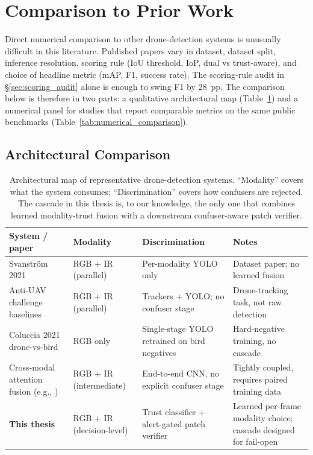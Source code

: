 \documentclass[12pt,a4paper,oneside,openright]{book}
\begin{document}
\section{Comparison to Prior Work}
\label{sec:comparison}

Direct numerical comparison to other drone-detection systems is unusually difficult in this literature. Published papers vary in dataset, dataset split, inference resolution, scoring rule (IoU threshold, IoP, dual vs trust-aware), and choice of headline metric (mAP, F1, success rate). The scoring-rule audit in \S\ref{sec:scoring_audit} alone is enough to swing F1 by 28~pp. The comparison below is therefore in two parts: a qualitative architectural map (Table~\ref{tab:related_systems}) and a numerical panel for studies that report comparable metrics on the same public benchmarks (Table~\ref{tab:numerical_comparison}).

\subsection{Architectural Comparison}

\begin{table}[htbp]
    \centering
    \caption{Architectural map of representative drone-detection systems. ``Modality'' covers what the system consumes; ``Discrimination'' covers how confusers are rejected. The cascade in this thesis is, to our knowledge, the only one that combines learned modality-trust fusion with a downstream confuser-aware patch verifier.}
    \label{tab:related_systems}
    \begin{tabular}{p{4.0cm}lll}
        \toprule
        System / paper & Modality & Discrimination & Notes \\
        \midrule
        Svanstr\"om 2021~\cite{svanstrom2021real} & RGB + IR (parallel) & Per-modality YOLO only & Dataset paper; no learned fusion \\
        Anti-UAV challenge baselines~\cite{jiang2021antiuav} & RGB + IR (parallel) & Trackers + YOLO; no confuser stage & Drone-tracking task, not raw detection \\
        Coluccia 2021 drone-vs-bird~\cite{coluccia2021dronevsbird} & RGB only & Single-stage YOLO retrained on bird negatives & Hard-negative training, no cascade \\
        Cross-modal attention fusion (e.g., \cite{wagner2016multispectral}) & RGB + IR (intermediate) & End-to-end CNN, no explicit confuser stage & Tightly coupled, requires paired training data \\
        \textbf{This thesis} & RGB + IR (decision-level) & Trust classifier + alert-gated patch verifier & Learned per-frame modality choice; cascade designed for fail-open \\
        \bottomrule
    \end{tabular}
\end{table}
\end{document}
